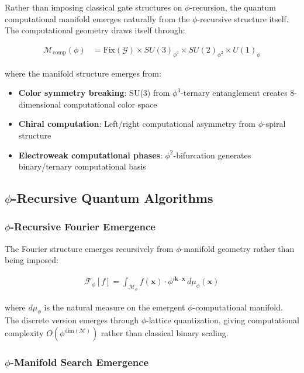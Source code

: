 Rather than imposing classical gate structures on $\phi$-recursion, the quantum computational manifold emerges naturally from the $\phi$-recursive structure itself. The computational geometry draws itself through:

\begin{align}
\mathcal{M}_{\text{comp}}(\phi) &= \text{Fix}(\mathcal{G}) \times SU(3)_{\phi^3} \times SU(2)_{\phi^2} \times U(1)_{\phi}
\end{align}

where the manifold structure emerges from:
\begin{itemize}
\item \textbf{Color symmetry breaking}: SU(3) from $\phi^3$-ternary entanglement creates 8-dimensional computational color space
\item \textbf{Chiral computation}: Left/right computational asymmetry from $\phi$-spiral structure  
\item \textbf{Electroweak computational phases}: $\phi^2$-bifurcation generates binary/ternary computational basis
\end{itemize}

\subsection{$\phi$-Recursive Quantum Algorithms}

\subsubsection{$\phi$-Recursive Fourier Emergence}

The Fourier structure emerges recursively from $\phi$-manifold geometry rather than being imposed:

\begin{align}
\mathcal{F}_\phi[f] = \int_{\mathcal{M}_\phi} f(\mathbf{x}) \cdot \phi^{i \mathbf{k} \cdot \mathbf{x}} \, d\mu_\phi(\mathbf{x})
\end{align}

where $d\mu_\phi$ is the natural measure on the emergent $\phi$-computational manifold. The discrete version emerges through $\phi$-lattice quantization, giving computational complexity $O(\phi^{\text{dim}(\mathcal{M})})$ rather than classical binary scaling.

\subsubsection{$\phi$-Manifold Search Emergence}

